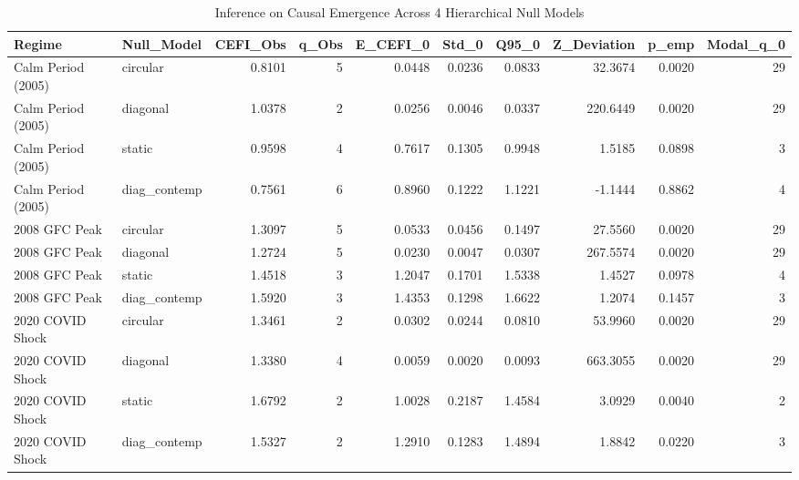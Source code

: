 \begin{table}
\caption{Inference on Causal Emergence Across 4 Hierarchical Null Models}
\label{tab:null_models}
\begin{tabular}{llrrrrrrrr}
\toprule
Regime & Null_Model & CEFI_Obs & q_Obs & E_CEFI_0 & Std_0 & Q95_0 & Z_Deviation & p_emp & Modal_q_0 \\
\midrule
Calm Period (2005) & circular & 0.8101 & 5 & 0.0448 & 0.0236 & 0.0833 & 32.3674 & 0.0020 & 29 \\
Calm Period (2005) & diagonal & 1.0378 & 2 & 0.0256 & 0.0046 & 0.0337 & 220.6449 & 0.0020 & 29 \\
Calm Period (2005) & static & 0.9598 & 4 & 0.7617 & 0.1305 & 0.9948 & 1.5185 & 0.0898 & 3 \\
Calm Period (2005) & diag_contemp & 0.7561 & 6 & 0.8960 & 0.1222 & 1.1221 & -1.1444 & 0.8862 & 4 \\
2008 GFC Peak & circular & 1.3097 & 5 & 0.0533 & 0.0456 & 0.1497 & 27.5560 & 0.0020 & 29 \\
2008 GFC Peak & diagonal & 1.2724 & 5 & 0.0230 & 0.0047 & 0.0307 & 267.5574 & 0.0020 & 29 \\
2008 GFC Peak & static & 1.4518 & 3 & 1.2047 & 0.1701 & 1.5338 & 1.4527 & 0.0978 & 4 \\
2008 GFC Peak & diag_contemp & 1.5920 & 3 & 1.4353 & 0.1298 & 1.6622 & 1.2074 & 0.1457 & 3 \\
2020 COVID Shock & circular & 1.3461 & 2 & 0.0302 & 0.0244 & 0.0810 & 53.9960 & 0.0020 & 29 \\
2020 COVID Shock & diagonal & 1.3380 & 4 & 0.0059 & 0.0020 & 0.0093 & 663.3055 & 0.0020 & 29 \\
2020 COVID Shock & static & 1.6792 & 2 & 1.0028 & 0.2187 & 1.4584 & 3.0929 & 0.0040 & 2 \\
2020 COVID Shock & diag_contemp & 1.5327 & 2 & 1.2910 & 0.1283 & 1.4894 & 1.8842 & 0.0220 & 3 \\
\bottomrule
\end{tabular}
\end{table}

